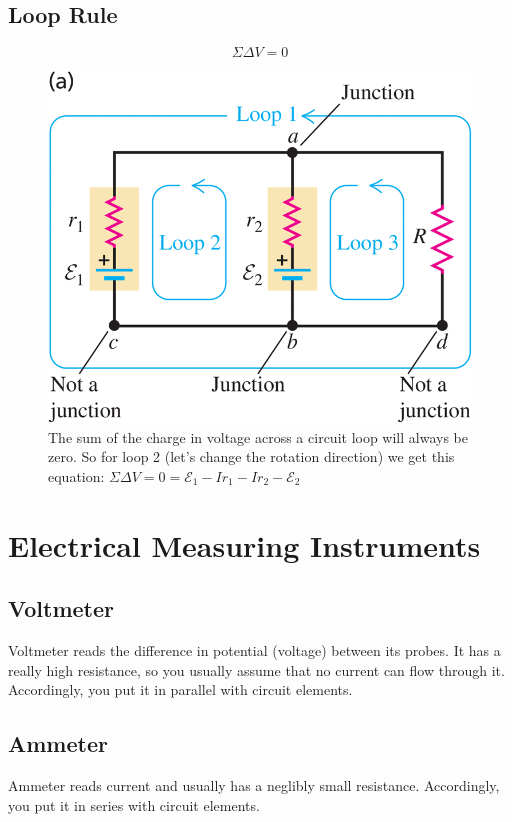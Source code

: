 \documentclass[10pt, a4paper, twocolumn]{article}
\begin{document}
        \subsection{Loop Rule}
            $$\Sigma \Delta V = 0$$
            \begin{figure}[H]
                \includegraphics[width=0.5\linewidth]{looprule} %
                \caption{The sum of the charge in voltage across a circuit loop will always be zero. So for loop 2 (let's change the rotation direction) we get this equation: $\Sigma \Delta V = 0 = \mathcal{E}_1 - I r_1 - I r_2 - \mathcal{E}_2$}
            \end{figure}
    \section{Electrical Measuring Instruments}
        \subsection{Voltmeter}
            Voltmeter reads the difference in potential (voltage) between its probes. It has a really high resistance, so you usually assume that no current can flow through it. Accordingly, you put it in parallel with circuit elements.
        \subsection{Ammeter}
            Ammeter reads current and usually has a neglibly small resistance. Accordingly, you put it in series with circuit elements.
\end{document}
